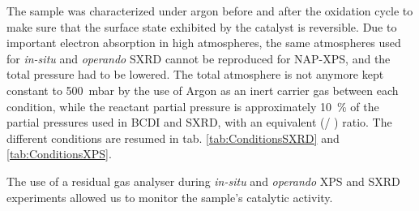 The sample was characterized under argon before and after the oxidation cycle to make sure that the surface state exhibited by the catalyst is reversible.
Due to important electron absorption in high atmospheres, the same atmospheres used for \textit{in-situ} and \textit{operando} SXRD cannot be reproduced for NAP-XPS, and the total pressure had to be lowered.
The total atmosphere is not anymore kept constant to \qty{500}{\milli\bar} by the use of Argon as an inert carrier gas between each condition, while the reactant partial pressure is approximately \qty{10}{\percent} of the partial pressures used in BCDI and SXRD, with an equivalent (\dioxygen / \ammonia) ratio.
The different conditions are resumed in tab. \ref{tab:ConditionsSXRD} and \ref{tab:ConditionsXPS}.

The use of a residual gas analyser during \textit{in-situ} and \textit{operando} XPS and SXRD experiments allowed us to monitor the sample's catalytic activity.

\begin{table}[!htb]
\centering
{}
\caption{Different atmospheres used to probe the ammonia oxidation on Pt (100) and Pt (111) single crystals with SXRD.}
\label{tab:ConditionsSXRD}
\end{table}

